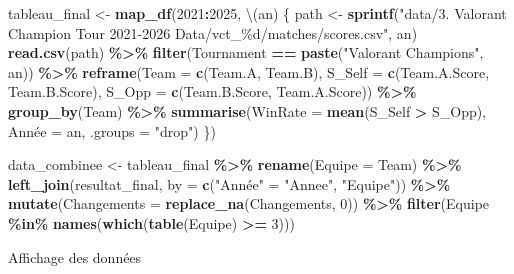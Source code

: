 \documentclass[
]{article}
\newenvironment{Shaded}{\begin{snugshade}}{\end{snugshade}}
\newcommand{\AttributeTok}[1]{\textcolor[rgb]{0.13,0.29,0.53}{#1}}
\newcommand{\DecValTok}[1]{\textcolor[rgb]{0.00,0.00,0.81}{#1}}
\newcommand{\FunctionTok}[1]{\textcolor[rgb]{0.13,0.29,0.53}{\textbf{#1}}}
\newcommand{\NormalTok}[1]{#1}
\newcommand{\OtherTok}[1]{\textcolor[rgb]{0.56,0.35,0.01}{#1}}
\newcommand{\SpecialCharTok}[1]{\textcolor[rgb]{0.81,0.36,0.00}{\textbf{#1}}}
\newcommand{\StringTok}[1]{\textcolor[rgb]{0.31,0.60,0.02}{#1}}
\begin{document}
\begin{Shaded}
\begin{Highlighting}[]
\NormalTok{tableau\_final }\OtherTok{\textless{}{-}} \FunctionTok{map\_df}\NormalTok{(}\DecValTok{2021}\SpecialCharTok{:}\DecValTok{2025}\NormalTok{, \textbackslash{}(an) \{}
\NormalTok{  path }\OtherTok{\textless{}{-}} \FunctionTok{sprintf}\NormalTok{(}\StringTok{"data/3. Valorant Champion Tour 2021{-}2026 Data/vct\_\%d/matches/scores.csv"}\NormalTok{, an)}
  \FunctionTok{read.csv}\NormalTok{(path) }\SpecialCharTok{\%\textgreater{}\%}
    \FunctionTok{filter}\NormalTok{(Tournament }\SpecialCharTok{==} \FunctionTok{paste}\NormalTok{(}\StringTok{"Valorant Champions"}\NormalTok{, an)) }\SpecialCharTok{\%\textgreater{}\%}
    \FunctionTok{reframe}\NormalTok{(}\AttributeTok{Team =} \FunctionTok{c}\NormalTok{(Team.A, Team.B), }\AttributeTok{S\_Self =} \FunctionTok{c}\NormalTok{(Team.A.Score, Team.B.Score), }\AttributeTok{S\_Opp =} \FunctionTok{c}\NormalTok{(Team.B.Score, Team.A.Score)) }\SpecialCharTok{\%\textgreater{}\%}
    \FunctionTok{group\_by}\NormalTok{(Team) }\SpecialCharTok{\%\textgreater{}\%}
    \FunctionTok{summarise}\NormalTok{(}\AttributeTok{WinRate =} \FunctionTok{mean}\NormalTok{(S\_Self }\SpecialCharTok{\textgreater{}}\NormalTok{ S\_Opp), Année }\OtherTok{=}\NormalTok{ an, }\AttributeTok{.groups =} \StringTok{"drop"}\NormalTok{)}
\NormalTok{\})}

\NormalTok{data\_combinee }\OtherTok{\textless{}{-}}\NormalTok{ tableau\_final }\SpecialCharTok{\%\textgreater{}\%}
  \FunctionTok{rename}\NormalTok{(}\AttributeTok{Equipe =}\NormalTok{ Team) }\SpecialCharTok{\%\textgreater{}\%}
  \FunctionTok{left\_join}\NormalTok{(resultat\_final, }\AttributeTok{by =} \FunctionTok{c}\NormalTok{(}\StringTok{"Année"} \OtherTok{=} \StringTok{"Annee"}\NormalTok{, }\StringTok{"Equipe"}\NormalTok{)) }\SpecialCharTok{\%\textgreater{}\%}
  \FunctionTok{mutate}\NormalTok{(}\AttributeTok{Changements =} \FunctionTok{replace\_na}\NormalTok{(Changements, }\DecValTok{0}\NormalTok{)) }\SpecialCharTok{\%\textgreater{}\%}
  \FunctionTok{filter}\NormalTok{(Equipe }\SpecialCharTok{\%in\%} \FunctionTok{names}\NormalTok{(}\FunctionTok{which}\NormalTok{(}\FunctionTok{table}\NormalTok{(Equipe) }\SpecialCharTok{\textgreater{}=} \DecValTok{3}\NormalTok{)))}
\end{Highlighting}
\end{Shaded}

Affichage des données
\end{document}
